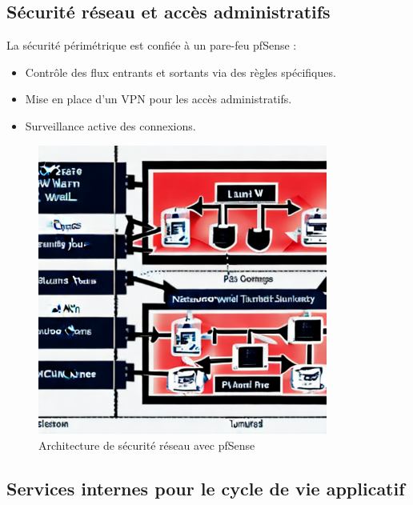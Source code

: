 \subsection{Sécurité réseau et accès administratifs}

La sécurité périmétrique est confiée à un pare-feu pfSense :
\begin{itemize}
	\item Contrôle des flux entrants et sortants via des règles spécifiques.
	\item Mise en place d’un VPN pour les accès administratifs.
	\item Surveillance active des connexions.
\end{itemize}

\begin{figure}[H]
	\centering
	\includegraphics[width=0.85\textwidth]{figures/pfsense-securite.png}
	\caption{Architecture de sécurité réseau avec pfSense}
\end{figure}

\subsection{Services internes pour le cycle de vie applicatif}

